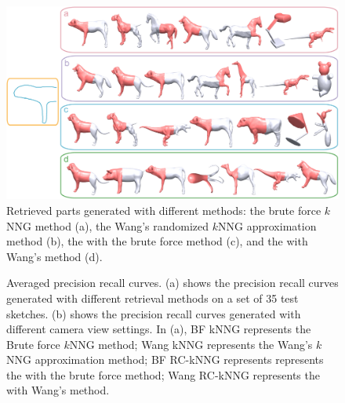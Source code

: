 \begin{figure} \centering
\includegraphics[width=1.0\linewidth]{./Material/RCKNNGComp.pdf}
\caption{Retrieved parts generated with different methods: the brute force $k$NNG method (a), the Wang's randomized $k$NNG approximation method (b),
the {\RCKNNG} with the brute force method (c), and the {\RCKNNG} with Wang's method (d).}
\label{fig:RCKNNGComp}
\end{figure}
\begin{figure}\centering
{}
\caption{Averaged precision recall curves. (a) shows the precision recall curves generated with different retrieval methods on a set of 35 test sketches.
(b) shows the precision recall curves generated with different camera view settings.
In (a), BF kNNG represents the Brute force $k$NNG method; Wang kNNG represents the Wang's $k$NNG approximation method;
BF RC-kNNG represents represents the {\RCKNNG} with the brute force method;
Wang RC-kNNG represents the {\RCKNNG} with Wang's method.}\label{fig:PreRecCurve}
\end{figure}

